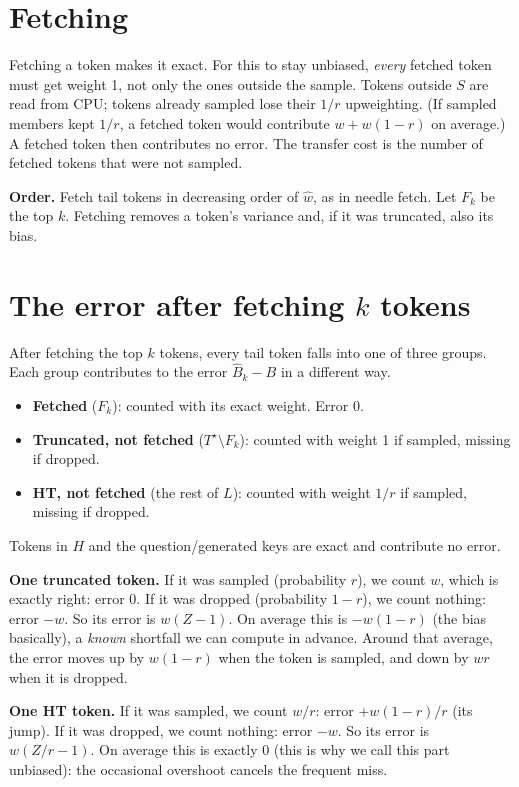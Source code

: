 \documentclass[11pt]{article}
\theoremstyle{definition}
\theoremstyle{remark}
\begin{document}
\section{Fetching}

Fetching a token makes it exact. For this to stay unbiased, \emph{every} fetched token must get weight 1, not only the ones
outside the sample. Tokens outside $S$ are read from CPU; tokens already sampled lose their $1/r$ upweighting. (If sampled
members kept $1/r$, a fetched token would contribute $w + w(1 - r)$ on average.) A fetched token then contributes no error.
The transfer cost is the number of fetched tokens that were not sampled.

\textbf{Order.} Fetch tail tokens in decreasing order of $\hat w$, as in needle fetch. Let $F_k$ be the top $k$. Fetching
removes a token's variance and, if it was truncated, also its bias.

\section{The error after fetching \texorpdfstring{$k$}{k} tokens}

After fetching the top $k$ tokens, every tail token falls into one of three groups. Each group contributes to the error
$\hat B_k - B$ in a different way.
\begin{itemize}
\item \textbf{Fetched} ($F_k$): counted with its exact weight. Error 0.
\item \textbf{Truncated, not fetched} ($T^\star \setminus F_k$): counted with weight 1 if sampled, missing if dropped.
\item \textbf{HT, not fetched} (the rest of $L$): counted with weight $1/r$ if sampled, missing if dropped.
\end{itemize}
Tokens in $H$ and the question/generated keys are exact and contribute no error.

\textbf{One truncated token.} If it was sampled (probability $r$), we count $w$, which is exactly right: error 0. If it was
dropped (probability $1 - r$), we count nothing: error $-w$. So its error is $w(Z - 1)$. On average this is $-w(1 - r)$
(the bias basically), a \emph{known} shortfall we can compute in advance. Around that average, the error moves up by
$w(1 - r)$ when the token is sampled, and down by $wr$ when it is dropped.

\textbf{One HT token.} If it was sampled, we count $w/r$: error $+w(1 - r)/r$ (its jump). If it was dropped, we count
nothing: error $-w$. So its error is $w(Z/r - 1)$. On average this is exactly 0 (this is why we call this part unbiased):
the occasional overshoot cancels the frequent miss.
\end{document}
